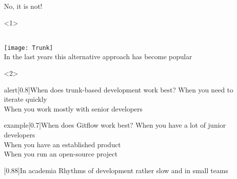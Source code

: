 \documentclass[usenames,svgnames,14pt]{beamer}
\begin{document}
\begin{frame}{No, it is not!}
    \PrepareURLsymbol[PB]
    \begin{onlyenv}<1>
        \begin{center}
            {\large{}}\\[3mm]
            \texttt{[image: Trunk]}\\[2mm]
            In the last years this alternative approach has become popular
        \end{center}
    \end{onlyenv}
    \begin{onlyenv}<2>
        \begin{varblock}{alert}[0.8\textwidth]{When does trunk-based development work best?}
            When you need to iterate quickly\\
            When you work mostly with senior developers
        \end{varblock}
        \begin{varblock}{example}[0.7\textwidth]{When does Gitflow work best?}
            When you have a lot of junior developers\\
            When you have an established product\\
            When you run an open-source project
        \end{varblock}
        \begin{varblock}{}[0.88\textwidth]{In academia}
            Rhythms of development rather slow and in small teams
        \end{varblock}
    \end{onlyenv}
\end{frame}


\end{document}
